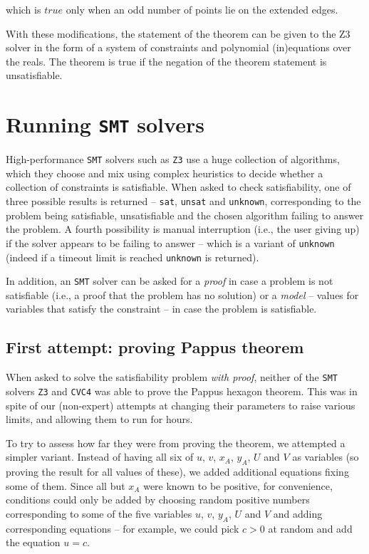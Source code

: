 \documentclass{amsart}
\theoremstyle{plain}
\theoremstyle{definition}
\theoremstyle{remark}
\begin{document}
which is \(true\) only when an odd number of points lie on the extended edges.

With these modifications, the statement of the theorem can be given to the Z3 solver in the form of a system of constraints and polynomial (in)equations over the reals.
The theorem is true if the negation of the theorem statement is unsatisfiable.

\section{Running \texttt{SMT} solvers}\label{running-smt-solvers}

High-performance \texttt{SMT} solvers such as \texttt{Z3} use a huge collection of algorithms, which they
choose and mix using complex heuristics to decide whether a collection
of constraints is satisfiable. When asked to check satisfiability, one of three possible
results is returned -- \texttt{sat}, \texttt{unsat} and \texttt{unknown}, corresponding to
the problem being satisfiable, unsatisfiable and the chosen algorithm failing to answer
the problem. A fourth possibility is manual interruption (i.e., the user giving up) if the solver appears to be failing
to answer -- which is a variant of \texttt{unknown} (indeed if a timeout limit is reached \texttt{unknown} is returned).

In addition, an \texttt{SMT} solver can be asked for a
\emph{proof} in case a problem is not satisfiable (i.e., a proof that
the problem has no solution) or a \emph{model} -- values for variables
that satisfy the constraint -- in case the problem is satisfiable.

\subsection{First attempt: proving Pappus theorem}

When asked to solve the satisfiability problem \emph{with proof},
neither of the \texttt{SMT} solvers \texttt{Z3} and \texttt{CVC4} was able to
prove the Pappus hexagon theorem. This was in spite of our (non-expert)
attempts at changing their parameters to raise various limits,
and allowing them to run for hours.

To try to assess how far they were from proving the theorem, we attempted
a simpler variant. Instead of having all six of \(u\), \(v\), \(x_A\),
\(y_A\), \(U\) and \(V\) as variables (so proving the result for all
values of these), we added additional equations fixing some of them.
Since all but \(x_A\) were known to be positive, for convenience,
conditions could only be added by choosing random positive numbers
corresponding to some of the five variables \(u\), \(v\), \(y_A\), \(U\)
and \(V\) and adding corresponding equations -- for example, we could
pick \(c > 0\) at random and add the equation \(u = c\).
\end{document}
